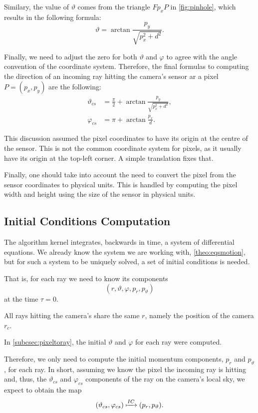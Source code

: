 Similary, the value of $\vartheta$ comes from the triangle $Fp_xP$ in \autoref{fig:pinhole}, which results in the following formula:
\[
	\vartheta = \arctan{\frac{p_y}{\sqrt{p_x^2 + d^2}}}.
\]

Finally, we need to adjust the zero for both $\vartheta$ and $\varphi$ to agree with the angle convention of the coordinate system. Therefore, the final formulas to computing the direction of an incoming ray hitting the camera's sensor ar a pixel $P = (p_x, p_y)$ are the following:
\begin{align}
	\vartheta_{cs} &= \frac{\pi}{2} + \arctan{\frac{p_y}{\sqrt{p_x^2 + d^2}}}, \\
	\varphi_{cs} &= \pi + \arctan{\frac{p_x}{d}}.
\end{align}

This discussion assumed the pixel coordinates to have its origin at the centre of the sensor. This is not the common coordinate system for pixels, as it usually have its origin at the top-left corner. A simple translation fixes that.

Finally, one should take into account the need to convert the pixel from the sensor coordinates to physical units. This is handled by computing the pixel width and height using the size of the sensor in physical units.

\subsection{Initial Conditions Computation}
The algorithm kernel integrates, backwards in time, a system of differential equations. We already know the system we are working with, \autoref{theo:eqsmotion}, but for such a system to be uniquely solved, a set of initial conditions is needed.

That is, for each ray we need to know its components \[(r, \vartheta, \varphi, p_r, p_\vartheta)\] at the time $\tau = 0$.

All rays hitting the camera's share the same $r$, namely the position of the camera $r_c$.

In \autoref{subcsec:pixeltoray}, the initial $\vartheta$ and $\varphi$ for each ray were computed.

Therefore, we only need to compute the initial momentum components, $p_r$ and $p_\vartheta$, for each ray. In short, assuming we know the pixel the incoming ray is hitting and, thus, the $\vartheta_{cs}$ and $\varphi_{cs}$ components of the ray on the camera's local sky, we expect to obtain the map
\[
	(\vartheta_{cs}, \varphi_{cs}) \xmapsto{IC} (p_r, p_\vartheta).
\]

